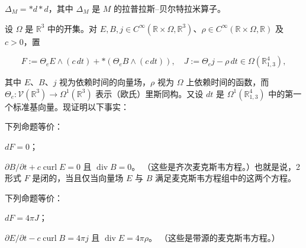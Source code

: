 \begin{exercises}
\begin{subitems}
\item

$ \Delta_{M} = \ast d\ast d $，其中 $ \Delta_{M} $ 是 $ M $ 的拉普拉斯–贝尔特拉米算子。

\end{subitems}

\item

设 $ \Omega $ 是 $ \mathbb{R}^{3} $ 中的开集。对 $ E, B, j \in C^{\infty}(\mathbb{R} \times \Omega, \mathbb{R}^{3}) $、$ \rho \in C^{\infty}(\mathbb{R} \times \Omega, \mathbb{R}) $ 及 $ c > 0 $，置

\[
F := \Theta_{e}E \wedge (c\,dt) + \ast(\Theta_{e}B \wedge (c\,dt)), \quad J := \Theta_{e}j - \rho\,dt \in \Omega(\mathbb{R}^{4}_{1,3}),
\]

其中 $ E $、$ B $、$ j $ 视为依赖时间的向量场，$ \rho $ 视为 $ \Omega $ 上依赖时间的函数，而 $ \Theta_{e}: \mathcal{V}(\mathbb{R}^{3}) \to \Omega^{1}(\mathbb{R}^{3}) $ 表示（欧氏）里斯同构。又设 $ dt $ 是 $ \Omega^{1}(\mathbb{R}^{4}_{1,3}) $ 中的第一个标准基向量。现证明以下事实：

\begin{items}
\item

下列命题等价：

\begin{subitems}
\item

$ dF = 0 $；

\item

$ \partial B/\partial t + c\operatorname{curl}E = 0 $ 且 $ \operatorname{div}B = 0 $。
（这些是齐次麦克斯韦方程。）也就是说，2 形式 $ F $ 是闭的，当且仅当向量场 $ E $ 与 $ B $ 满足麦克斯韦方程组中的这两个方程。

\end{subitems}

\item

下列命题等价：

\begin{subitems}
\item

$ dF = 4\pi J $；

\item

$ \partial E/\partial t - c\operatorname{curl}B = 4\pi j $ 且 $ \operatorname{div}E = 4\pi\rho $。
（这些是带源的麦克斯韦方程。）

\end{subitems}


\end{items}
\end{exercises}
